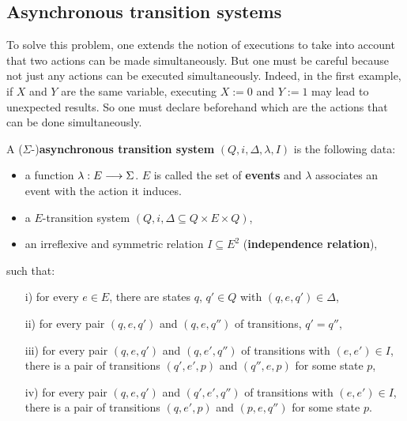 	
	\subsection{Asynchronous transition systems}
	\label{subsec:ats}
	
	To solve this problem, one extends the notion of executions to take into account that two actions can be made simultaneously. But one must be careful because not just any actions can be executed simultaneously. Indeed, in the first example, if $X$ and $Y$ are the same variable, executing $X := 0$ and $Y := 1$ may lead to unexpected results. So one must declare beforehand which are the actions that can be done simultaneously. 
	

	A ($\Sigma$-)\textbf{asynchronous transition system} \cite{shields85,bednarczyk87} $(Q,i,\Delta,\lambda,I)$ is the following data:
		\begin{itemize}
			\item a function $\lambda : E \longrightarrow \Sigma$. $E$ is called the set of \textbf{events} and $\lambda$ associates an event with the action it induces.
			\item a $E$-transition system $(Q,i,\Delta\subseteq Q\times E \times Q)$,
			\item an irreflexive and symmetric relation $I \subseteq E^2$ (\textbf{independence relation}),
		\end{itemize}
		
\noindent such that:
		
		\begin{itemize}
			\item[i)] for every $e \in E$, there are states $q$, $q' \in Q$ with $(q,e,q') \in \Delta$,
			\item[ii)] for every pair $(q,e,q')$ and $(q,e,q'')$ of transitions, $q' = q''$, 
			\item[iii)] for every pair $(q,e,q')$ and $(q,e',q'')$ of transitions with $(e,e') \in I$, there is a pair of transitions $(q',e',p)$ and $(q'',e,p)$ for some state $p$,
			
				\begin{figure}[H]
					\begin{center}
    						
  					\end{center}
				\end{figure}
			
			\item[iv)] for every pair $(q,e,q')$ and $(q',e',q'')$ of transitions with $(e,e') \in I$, there is a pair of transitions $(q,e',p)$ and $(p,e,q'')$ for some state $p$.
			
				\begin{figure}[H]
					\begin{center}
    						
  					\end{center}
				\end{figure}
		\end{itemize}

